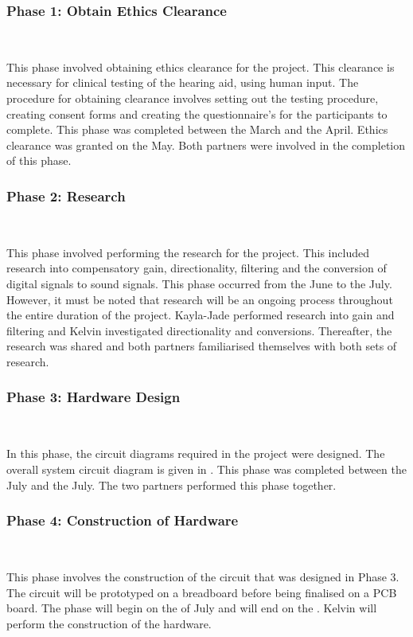 \documentclass[10pt,twocolumn]{witseiepaper}
\begin{document}
\subsubsection*{Phase 1: Obtain Ethics Clearance} $    $

This phase involved obtaining ethics clearance for the project. This clearance is necessary for clinical testing of the hearing aid, using human input. The procedure for obtaining clearance involves setting out the testing procedure, creating consent forms and creating the questionnaire's for the participants to complete. This phase was completed between the  March and the  April. Ethics clearance was granted on the  May. Both partners were involved in the completion of this phase.

\subsubsection*{Phase 2: Research} $    $

This phase involved performing the research for the project. This included research into compensatory gain, directionality, filtering and the conversion of digital signals to sound signals. This phase occurred from the  June to the  July. However, it must be noted that research will be an ongoing process throughout the entire duration of the project. Kayla-Jade performed research into gain and filtering and Kelvin investigated directionality and conversions. Thereafter, the research was shared and both partners familiarised themselves with both sets of research.

\subsubsection*{Phase 3: Hardware Design } $    $

In this phase, the circuit diagrams required in the project were designed. The overall system circuit diagram is given in . This phase was completed between the  July and the  July. The two partners performed this phase together.

\subsubsection*{Phase 4: Construction of Hardware } $    $

This phase involves the construction of the circuit that was designed in Phase 3. The circuit will be prototyped on a breadboard before being finalised on a PCB board. The phase will begin on the  of July and will end on the . Kelvin will perform the construction of the hardware.
\end{document}

